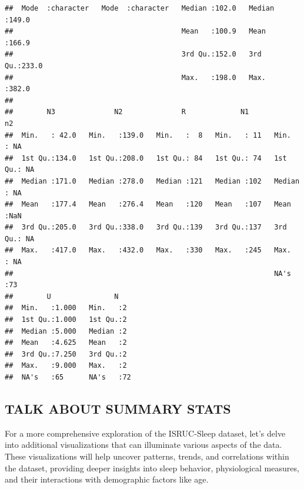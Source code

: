 \documentclass[
]{article}
\begin{document}
\begin{verbatim}
##  Mode  :character   Mode  :character   Median :102.0   Median :149.0  
##                                        Mean   :100.9   Mean   :166.9  
##                                        3rd Qu.:152.0   3rd Qu.:233.0  
##                                        Max.   :198.0   Max.   :382.0  
##                                                                       
##        N3              N2              R             N1            n2     
##  Min.   : 42.0   Min.   :139.0   Min.   :  8   Min.   : 11   Min.   : NA  
##  1st Qu.:134.0   1st Qu.:208.0   1st Qu.: 84   1st Qu.: 74   1st Qu.: NA  
##  Median :171.0   Median :278.0   Median :121   Median :102   Median : NA  
##  Mean   :177.4   Mean   :276.4   Mean   :120   Mean   :107   Mean   :NaN  
##  3rd Qu.:205.0   3rd Qu.:338.0   3rd Qu.:139   3rd Qu.:137   3rd Qu.: NA  
##  Max.   :417.0   Max.   :432.0   Max.   :330   Max.   :245   Max.   : NA  
##                                                              NA's   :73   
##        U               N     
##  Min.   :1.000   Min.   :2   
##  1st Qu.:1.000   1st Qu.:2   
##  Median :5.000   Median :2   
##  Mean   :4.625   Mean   :2   
##  3rd Qu.:7.250   3rd Qu.:2   
##  Max.   :9.000   Max.   :2   
##  NA's   :65      NA's   :72
\end{verbatim}

\hypertarget{talk-about-summary-stats}{%
\subsection{TALK ABOUT SUMMARY STATS}\label{talk-about-summary-stats}}

For a more comprehensive exploration of the ISRUC-Sleep dataset, let's
delve into additional visualizations that can illuminate various aspects
of the data. These visualizations will help uncover patterns, trends,
and correlations within the dataset, providing deeper insights into
sleep behavior, physiological measures, and their interactions with
demographic factors like age.
\end{document}
